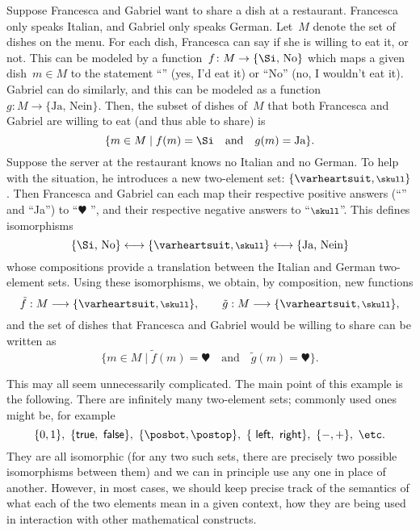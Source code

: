 \begin{example}
  Suppose Francesca and Gabriel want to share a dish at a restaurant. Francesca only speaks Italian, and Gabriel only speaks German. Let~$M$ denote the set of dishes on the menu. For each dish, Francesca can say if she is willing to eat it, or not. This can be modeled by a function~$f\colon M \to \{ \text{\Si, No} \}$ which maps a given dish~$m \in M$ to the statement ``\Si'' (yes, I'd eat it) or ``No'' (no, I wouldn't eat it). Gabriel can do similarly, and this can be modeled as a function~$g\colon M \to \{ \text{Ja, Nein} \}$.
  Then, the subset of dishes of~$M$ that both Francesca and Gabriel are willing to eat (and thus able to share) is
  \begin{equation*}
    \{ m \in M \mid f(m) = \text{\Si} \quad \text{and} \quad g(m) = \text{Ja} \}.
  \end{equation*}
  Suppose the server at the restaurant knows no Italian and no German. To help with the situation, he introduces a new two-element set: $\{ \varheartsuit, \mbox{\footnotesize $\skull$} \}$. Then Francesca and Gabriel can each map their respective positive answers (``\Si'' and ``Ja'') to ``$\varheartsuit$ '', and their respective negative answers to ``$\mbox{\footnotesize $\skull$}$''. This defines isomorphisms
\begin{equation*}
\{ \text{\Si, No} \} \longleftrightarrow \{ \varheartsuit, \mbox{\footnotesize $\skull$} \} \longleftrightarrow \{ \text{Ja, Nein} \}
\end{equation*}
whose compositions provide a translation between the Italian and German two-element sets. Using these isomorphisms, we obtain, by composition, new functions
\begin{equation*}
\tilde f: M \longrightarrow \{ \varheartsuit, \mbox{\footnotesize $\skull$} \}, \qquad \tilde g: M \longrightarrow \{ \varheartsuit, \mbox{\footnotesize $\skull$} \},
\end{equation*}
and the set of dishes that Francesca and Gabriel would be willing to share can be written as
\begin{equation*}
\{ m \in M \mid \tilde f(m) = \varheartsuit \quad \text{and} \quad \tilde g(m) = \varheartsuit \}.
\end{equation*}

This may all seem unnecessarily complicated. The main point of this example is the following. There are infinitely many two-element sets; commonly used ones might be, for example
\begin{equation*}
\{0, 1 \}, \ \{  \textsf{true}, \textsf{  false} \}, \ \{ \posbot, \postop \}, \ \{ \textsf{ left}, \textsf{ right} \},  \ \{ -, + \}, \text{ \etc.}
\end{equation*}
They are all isomorphic (for any two such sets, there are precisely two possible isomorphisms between them) and we can in principle use any one in place of another. However, in most cases, we should keep precise track of the semantics of what each of the two elements mean in a given context, \ie how they are being used in interaction with other mathematical constructs.
\end{example}

